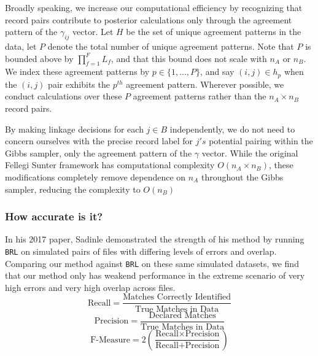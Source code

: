 \documentclass[
  12pt,
]{article}
\begin{document}
Broadly speaking, we increase our computational efficiency by
recognizing that record pairs contribute to posterior calculations only
through the agreement pattern of the \(\gamma_{ij}\) vector. Let \(H\)
be the set of unique agreement patterns in the data, let \(P\) denote
the total number of unique agreement patterns. Note that \(P\) is
bounded above by \(\prod_{f=1}^F L_f\), and that this bound does not
scale with \(n_A\) or \(n_B\). We index these agreement patterns by
\(p \in \{1, \ldots, P\}\), and say \((i,j) \in h_p\) when the \((i,j)\)
pair exhibits the \(p^{th}\) agreement pattern. Wherever possible, we
conduct calculations over these \(P\) agreement patterns rather than the
\(n_A \times n_B\) record pairs.

By making linkage decisions for each \(j\in B\) independently, we do not
need to concern ourselves with the precise record label for \(j's\)
potential pairing within the Gibbs sampler, only the agreement pattern
of the \(\gamma\) vector. While the original Fellegi Sunter framework
has computational complexity \(O(n_A \times n_B)\), these modifications
completely remove dependence on \(n_A\) throughout the Gibbs sampler,
reducing the complexity to \(O(n_B)\)

\hypertarget{how-accurate-is-it}{%
\subsubsection{How accurate is it?}\label{how-accurate-is-it}}

In his 2017 paper, Sadinle demonstrated the strength of his method by
running \texttt{BRL} on simulated pairs of files with differing levels
of errors and overlap. Comparing our method against \texttt{BRL} on
these same simulated datasets, we find that our method only has weakend
performance in the extreme scenario of very high errors and very high
overlap across files.
\[\text{Recall} = \frac{\text{Matches Correctly Identified}}{\text{True Matches in Data}}\]
\[\text{Precision} = \frac{\text{Declared Matches}}{\text{True Matches in Data}}\]
\[\text{F-Measure} = 2\left(\frac{\text{Recall} \times \text{Precision}}{\text{Recall} + \text{Precision}}\right)\]
\end{document}
